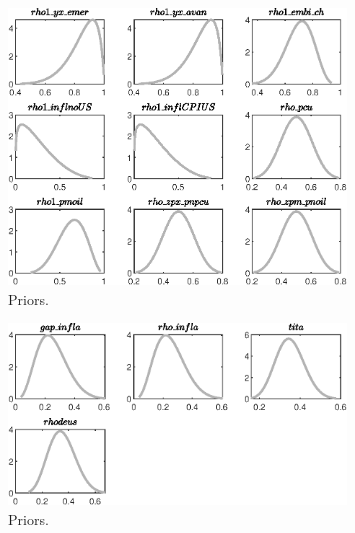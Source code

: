 \begin{figure}[H]
\centering
\includegraphics[width=0.80\textwidth]{calculate_estimate/graphs/calculate_estimate_Priors7}
\caption{Priors.}\label{Fig:Priors:7}
\end{figure}
\begin{figure}[H]
\centering
\includegraphics[width=0.80\textwidth]{calculate_estimate/graphs/calculate_estimate_Priors8}
\caption{Priors.}\label{Fig:Priors:8}
\end{figure}
 
